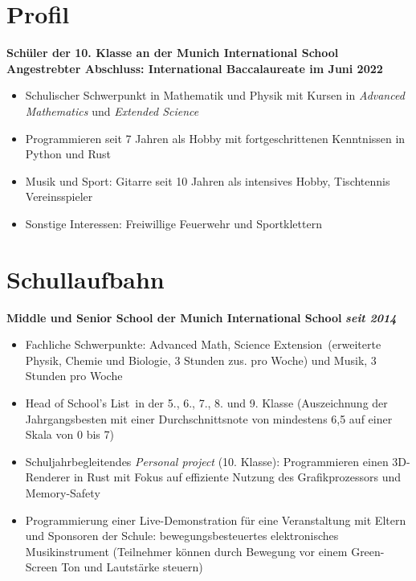 \documentclass[12pt]{article}
\newcommand{\sect}[1]{
  {
    \vspace{12pt}
    \section*{
      \fontsize{18}{0}\selectfont
      \hspace{-12pt}
      \vspace{-12pt}
      #1
    }
    \vspace{-6pt}
  }
}
\begin{document}
\sect{Profil}
\vspace{6pt}

\textbf{Sch{\"u}ler der 10. Klasse an der Munich International School \\
  Angestrebter Abschluss: International Baccalaureate im Juni 2022}

\begin{itemize}[leftmargin=*]
  \itemsep0pt

\item Schulischer Schwerpunkt in Mathematik und Physik mit Kursen in \textit{\glqq
  Advanced Mathematics\grqq} und \textit{\glqq Extended Science\grqq}

\item Programmieren seit 7 Jahren als Hobby mit fortgeschrittenen Kenntnissen in
  Python und Rust

\item Musik und Sport: Gitarre seit 10 Jahren als intensives Hobby,
  Tischtennis Vereinsspieler

\item Sonstige Interessen: Freiwillige Feuerwehr und Sportklettern

\end{itemize}
\vspace{-24pt}

\sect{Schullaufbahn}
\vspace{6pt}

\textbf{Middle und Senior School der Munich International School} \hfill{\textit{\textbf{seit 2014}}}

\vspace{-6pt}
\begin{itemize}[leftmargin=*]
  \itemsep3pt

\item Fachliche Schwerpunkte: \glqq Advanced Math\grqq, \glqq Science
  Extension\grqq\, (erweiterte Physik, Chemie und Biologie, 3 Stunden zus. pro
  Woche) und Musik, 3 Stunden pro Woche
  
\item \glqq Head of School's List\grqq\, in der 5., 6., 7., 8. und 9. Klasse
  (Auszeichnung der Jahrgangsbesten mit einer Durchschnittsnote von mindestens
  6,5 auf einer Skala von 0 bis 7)
  
\item Schuljahrbegleitendes \textit{\glqq Personal project\grqq} (10. Klasse):
  Programmieren einen 3D-Renderer in Rust mit Fokus auf effiziente Nutzung
  des Grafikprozessors und Memory-Safety
  
\item Programmierung einer Live-Demonstration f{\"u}r eine Veranstaltung mit
  Eltern und Sponsoren der Schule: bewegungsbesteuertes elektronisches
  Musikinstrument (Teilnehmer k{\"o}nnen durch Bewegung vor
  einem Green-Screen Ton und Lautst{\"a}rke steuern)
\end{itemize}
\vspace{-6pt}
\end{document}
